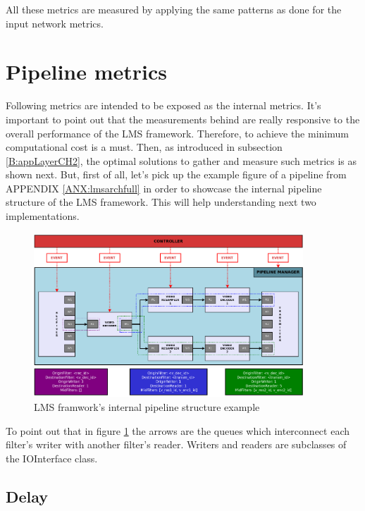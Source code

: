 All these metrics are measured by applying the same patterns as done for the input network metrics.

\section{Pipeline metrics}

Following metrics are intended to be exposed as the internal metrics. It's important to point out that the measurements behind are really responsive to the overall performance of the LMS framework. Therefore, to achieve the minimum computational cost is a must. Then, as introduced in subsection \ref{B:appLayerCH2}, the optimal solutions to gather and measure such metrics is as shown next. But, first of all, let's pick up the example figure of a pipeline from APPENDIX \ref{ANX:lmsarchfull} in order to showcase the internal pipeline structure of the LMS framework. This will help understanding next two implementations.

\begin{figure}[!htb]
\begin{center}
\includegraphics[width=0.9\textwidth]{./images/LMSpipelineBasicOne.png}
\caption{LMS framwork's internal pipeline structure example}
\label{F:lmsps}
\end{center}
\end{figure}

To point out that in figure \ref{F:lmsps} the arrows are the queues which interconnect each filter's writer with another filter's reader. Writers and readers are subclasses of the IOInterface class.

\subsection{Delay}

